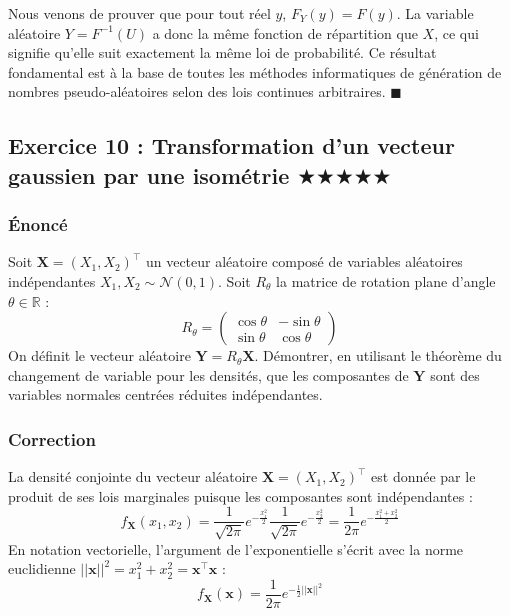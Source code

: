 \documentclass[11pt,a4paper]{article}
\begin{document}
Nous venons de prouver que pour tout réel $y$, $F_Y(y) = F(y)$.
La variable aléatoire $Y = F^{-1}(U)$ a donc la même fonction de répartition que $X$, ce qui signifie qu'elle suit exactement la même loi de probabilité. Ce résultat fondamental est à la base de toutes les méthodes informatiques de génération de nombres pseudo-aléatoires selon des lois continues arbitraires. $\blacksquare$


\subsection*{Exercice 10 : Transformation d'un vecteur gaussien par une isométrie \quad $\bigstar\bigstar\bigstar\bigstar\bigstar$}

\subsubsection*{Énoncé}

Soit $\mathbf{X} = (X_1, X_2)^\top$ un vecteur aléatoire composé de variables aléatoires indépendantes $X_1, X_2 \sim \mathcal{N}(0,1)$.
Soit $R_\theta$ la matrice de rotation plane d'angle $\theta \in \mathbb{R}$ :
$$ R_\theta = \begin{pmatrix} \cos\theta & -\sin\theta \\ \sin\theta & \cos\theta \end{pmatrix} $$
On définit le vecteur aléatoire $\mathbf{Y} = R_\theta \mathbf{X}$.
Démontrer, en utilisant le théorème du changement de variable pour les densités, que les composantes de $\mathbf{Y}$ sont des variables normales centrées réduites indépendantes.

\subsubsection*{Correction}

La densité conjointe du vecteur aléatoire $\mathbf{X} = (X_1, X_2)^\top$ est donnée par le produit de ses lois marginales puisque les composantes sont indépendantes :
$$ f_\mathbf{X}(x_1, x_2) = \frac{1}{\sqrt{2\pi}} e^{-\frac{x_1^2}{2}} \frac{1}{\sqrt{2\pi}} e^{-\frac{x_2^2}{2}} = \frac{1}{2\pi} e^{-\frac{x_1^2 + x_2^2}{2}} $$
En notation vectorielle, l'argument de l'exponentielle s'écrit avec la norme euclidienne $||\mathbf{x}||^2 = x_1^2 + x_2^2 = \mathbf{x}^\top \mathbf{x}$ :
$$ f_\mathbf{X}(\mathbf{x}) = \frac{1}{2\pi} e^{-\frac{1}{2}||\mathbf{x}||^2} $$
\end{document}
